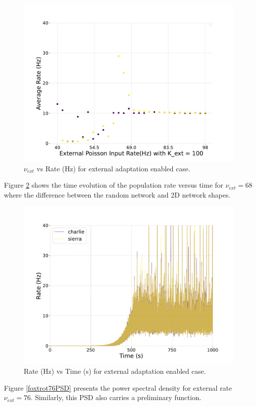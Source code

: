 \documentclass[a4paper,12pt]{article}
\begin{document}
\begin{figure}[H] 
    \centering
    \includegraphics[width=0.8\linewidth]{nuext_vs_activity_foxtrot.pdf}
    \caption{$\nu_{ext}$ vs Rate (Hz) for external adaptation enabled case.}
    \label{foxtrot}
\end{figure}
Figure \ref{foxtrot_rate} shows the time evolution of the population rate versus time for $\nu_{ext}=68$ where the difference between the random network and 2D network shapes. 
\begin{figure}[H] 
    \centering
    \includegraphics[width=0.8\linewidth]{nu_ext_68rate_over_time_homeostasis_foxtrot.pdf}
    \caption{ Rate (Hz) vs Time (s) for external adaptation enabled case.}
    \label{foxtrot_rate}
\end{figure}
Figure \ref{foxtrot76PSD} presents the power spectral density for external rate $\nu_{ext} = 76$. Similarly, this PSD also carries a preliminary function.
\end{document}
